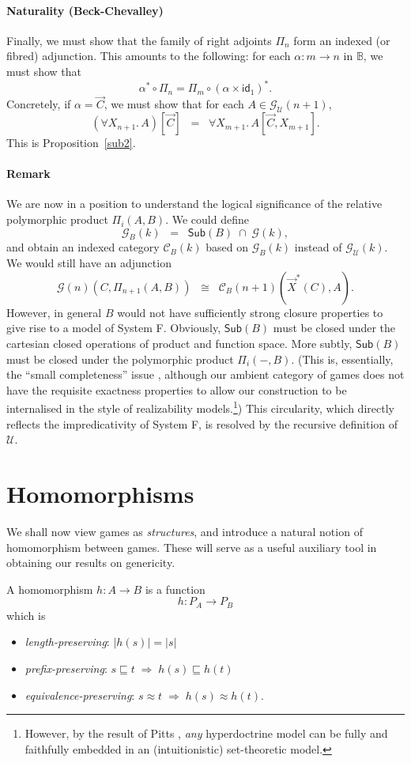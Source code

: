 \documentclass[a4paper,11pt]{article}
\newcommand{\gequiv}{\approx}
\newcommand{\UU}{\mathcal{U}}
\newcommand{\GG}[1]{\mathcal{G}(#1)}
\newcommand{\ident}{\mathsf{id}}
\newcommand{\ICC}{\mathcal{C}}
\newcommand{\CCB}{\ICC_{B}}
\newcommand{\GB}[1]{\mathcal{G}_{B}(#1)}
\newcommand{\GU}[1]{\mathcal{G}_{\UU}(#1)}
\newcommand{\SubB}{\mathsf{Sub}(B)}
\newcommand{\Base}{\mathbb{B}}
\begin{document}
\paragraph{Naturality (Beck-Chevalley)}
Finally, we must show that the family of right adjoints $\Pi_n$ form
an indexed (or fibred) adjunction. This amounts to the following: for
each $\alpha : m \longrightarrow n$ in $\Base$, we must show that
\[ \alpha^{\ast} \circ \Pi_n = \Pi_m \circ (\alpha \times
\ident_{1})^{\ast} . \]
Concretely, if $\alpha = \vec{C}$, we must show that for each $A \in
\GU{n+1}$,
\[ (\forall X_{n+1}. \, A)[\vec{C}] \;\; = \;\; \forall X_{m+1}. \,
A[\vec{C}, X_{m+1}] . \]
This is Proposition~\ref{sub2}.

\paragraph{Remark}
We are now in a position to understand the logical significance of the relative polymorphic product $\Pi_i (A, B)$. We could define
\[ \GB{k} \;\; =\;\; \SubB \; \cap \; \GG{k} , \]
and obtain an indexed category $\CCB (k)$ based on $\GB{k}$ instead of $\GU{k}$. We would still have an adjunction
\[  \GG{n} (C, \Pi_{n+1}( A, B)) \;\; \cong \;\; \CCB
(n+1)(\vec{X}^{\ast}(C), A) . \]
However, in general $B$ would not have sufficiently strong closure
properties to give rise to a model of System F. Obviously, $\SubB$
must be closed under the cartesian closed operations of product and
function space. More subtly, $\SubB$ must be closed under the
polymorphic product $\Pi_i ({-}, B)$. (This is, essentially, the
``small completeness'' issue \cite{Hyl88}, although our ambient category of
games does not have the requisite exactness properties to allow our
construction to be internalised in the style of realizability
models.\footnote{However, by the result of Pitts \cite{Pit88}, \emph{any}
hyperdoctrine model can be fully and faithfully embedded in an
(intuitionistic) set-theoretic model.}) This circularity, which directly reflects the impredicativity of System F, is resolved by the recursive definition of $\UU$.

\section{Homomorphisms}
We shall now view games as \emph{structures}, and introduce a natural
notion of homomorphism between games. These will serve as a useful
auxiliary tool in obtaining our results on genericity.

A homomorphism $h : A \longrightarrow B$ is a function
\[ h : P_A \longrightarrow P_B \]
which is
\begin{itemize}
\item \emph{length-preserving}: $|h(s)| = |s|$
\item \emph{prefix-preserving}: $s \sqsubseteq t \; \Rightarrow \;
  h(s) \sqsubseteq h(t)$
\item \emph{equivalence-preserving}: $s \gequiv t \; \Rightarrow \;
  h(s) \gequiv h(t)$.
\end{itemize}
\end{document}
